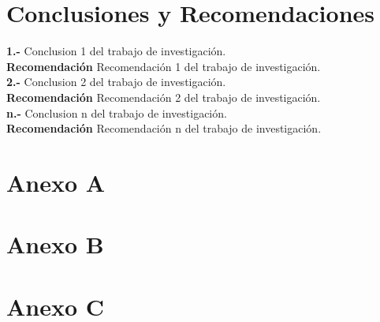 \documentclass[
]{article}
\begin{document}
\section{Conclusiones y Recomendaciones}

\textbf{1.-} Conclusion 1 del trabajo de investigación.\\

\textbf{Recomendación} Recomendación 1 del trabajo de investigación.\\

\textbf{2.-} Conclusion 2 del trabajo de investigación.\\

\textbf{Recomendación} Recomendación 2 del trabajo de investigación.\\

\textbf{n.-} Conclusion n del trabajo de investigación.\\

\textbf{Recomendación} Recomendación n del trabajo de investigación.\\

\section{Anexo A}

\section{Anexo B}

\section{Anexo C}


\end{document}

